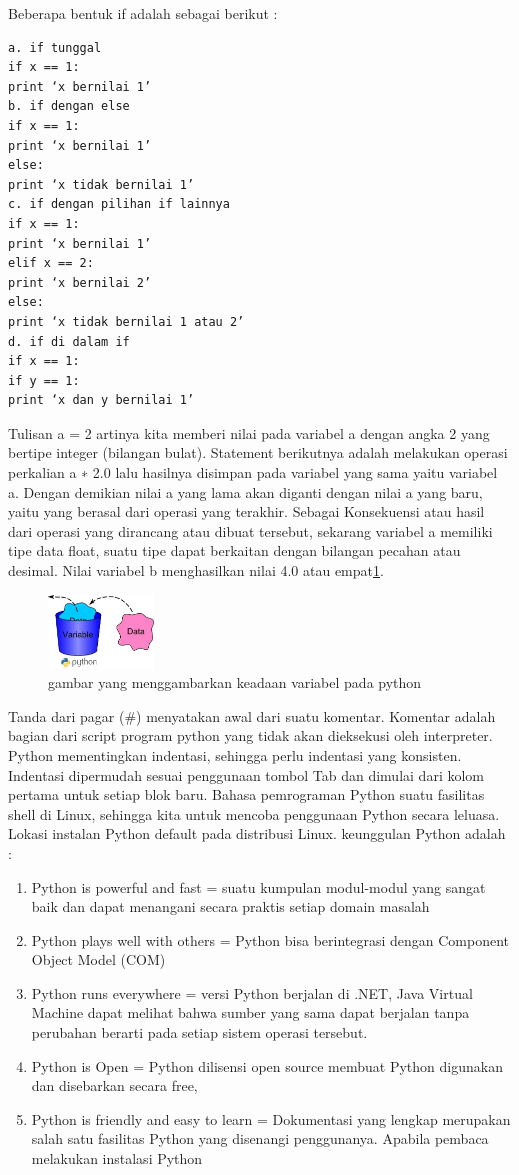 Beberapa bentuk if adalah sebagai berikut :
\begin{verbatim}
a. if tunggal
if x == 1:
print ‘x bernilai 1’
b. if dengan else
if x == 1:
print ‘x bernilai 1’
else:
print ‘x tidak bernilai 1’
c. if dengan pilihan if lainnya
if x == 1:
print ‘x bernilai 1’
elif x == 2:
print ‘x bernilai 2’
else:
print ‘x tidak bernilai 1 atau 2’
d. if di dalam if
if x == 1:
if y == 1:
print ‘x dan y bernilai 1’
\end{verbatim}

Tulisan a = 2 artinya kita memberi nilai pada variabel a dengan angka 2 yang bertipe integer
(bilangan bulat). Statement berikutnya adalah melakukan operasi perkalian a ∗ 2.0 lalu hasilnya
disimpan pada variabel yang sama yaitu variabel a. Dengan demikian nilai a yang lama
akan diganti dengan nilai a yang baru, yaitu yang berasal dari operasi yang terakhir.
Sebagai Konsekuensi atau hasil dari operasi yang dirancang atau dibuat tersebut, 
sekarang variabel a memiliki tipe data float, 
suatu tipe dapat berkaitan dengan bilangan pecahan atau desimal. 
Nilai variabel b menghasilkan nilai 4.0 atau empat\ref{pythonvariable}.
\begin{figure}[ht]
    \centerline{\includegraphics[width=0.25\textwidth]{figures/pythonvariable.png}}
    \caption{gambar yang menggambarkan keadaan variabel pada python}
    \label{pythonvariable}
    \end{figure}

Tanda dari pagar (\#) menyatakan awal dari suatu komentar. Komentar adalah bagian dari
script program python yang tidak akan dieksekusi oleh interpreter. 
Python mementingkan indentasi, sehingga perlu indentasi yang konsisten. Indentasi dipermudah sesuai penggunaan
tombol Tab dan dimulai dari kolom pertama untuk setiap blok baru. 
Bahasa pemrograman Python suatu fasilitas  shell di Linux, sehingga kita untuk mencoba penggunaan
Python secara leluasa. Lokasi instalan Python default pada distribusi Linux.
keunggulan Python adalah :
\begin{enumerate}
\item
Python is powerful and fast = suatu kumpulan modul-modul yang sangat baik dan dapat menangani secara praktis setiap domain masalah
\item
Python plays well with others = Python bisa berintegrasi dengan Component Object Model (COM) 
\item
Python runs everywhere = versi Python berjalan di .NET, Java Virtual Machine dapat melihat bahwa sumber yang sama dapat berjalan tanpa perubahan berarti pada setiap sistem operasi tersebut.
\item
Python is Open = Python dilisensi open source membuat Python digunakan dan disebarkan secara free,
\item
Python is friendly and easy to learn = Dokumentasi yang lengkap merupakan salah satu fasilitas Python yang disenangi penggunanya. Apabila pembaca melakukan instalasi Python
\end{enumerate}

